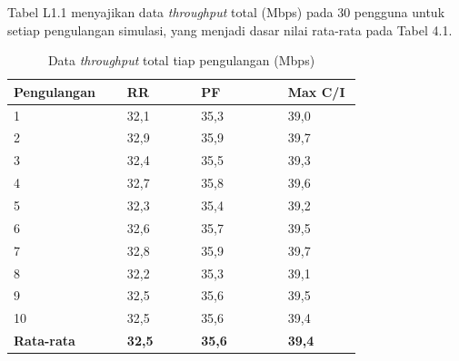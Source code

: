 Tabel L1.1 menyajikan data \textit{throughput} total (Mbps) pada 30 pengguna untuk setiap pengulangan simulasi, yang menjadi dasar nilai rata-rata pada Tabel 4.1.

\begin{singlespace}
\begin{longtable}{|p{0.22\linewidth}|p{0.17\linewidth}|p{0.2\linewidth}|p{0.17\linewidth}|}
\caption{Data \textit{throughput} total tiap pengulangan (Mbps)}\\
\hline
\textbf{Pengulangan} & \textbf{RR} & \textbf{PF} & \textbf{Max C/I} \\
\hline
1 & 32,1 & 35,3 & 39,0 \\
\hline
2 & 32,9 & 35,9 & 39,7 \\
\hline
3 & 32,4 & 35,5 & 39,3 \\
\hline
4 & 32,7 & 35,8 & 39,6 \\
\hline
5 & 32,3 & 35,4 & 39,2 \\
\hline
6 & 32,6 & 35,7 & 39,5 \\
\hline
7 & 32,8 & 35,9 & 39,7 \\
\hline
8 & 32,2 & 35,3 & 39,1 \\
\hline
9 & 32,5 & 35,6 & 39,5 \\
\hline
10 & 32,5 & 35,6 & 39,4 \\
\hline
\textbf{Rata-rata} & \textbf{32,5} & \textbf{35,6} & \textbf{39,4} \\
\hline
\end{longtable}
\end{singlespace}
